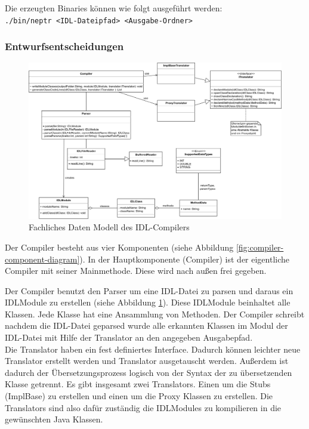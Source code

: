 \documentclass{article}
\begin{document}
Die erzeugten Binaries können wie folgt ausgeführt werden:\\

\texttt{./bin/neptr <IDL-Dateipfad> <Ausgabe-Ordner>}

\subsubsection{Entwurfsentscheidungen}
\begin{figure}[H]
    \centering
    \includegraphics[width=\textwidth]{Compiler_FDM.png}
    \caption[fdm-compiler]{Fachliches Daten Modell des IDL-Compilers}
    \label{fig:fdm-compiler}
\end{figure}

Der Compiler besteht aus vier Komponenten (siehe Abbildung \ref{fig:compiler-component-diagram}). In der
Hauptkomponente (Compiler) ist der eigentliche Compiler mit seiner Mainmethode. Diese wird nach außen frei gegeben.

Der Compiler benutzt den Parser um eine IDL-Datei zu parsen und daraus ein IDLModule zu erstellen (siehe Abbildung
\ref{fig:fdm-compiler}). Diese IDLModule beinhaltet alle Klassen. Jede Klasse hat eine Ansammlung von Methoden.
Der Compiler schreibt nachdem die IDL-Datei geparsed wurde alle erkannten Klassen im Modul der IDL-Datei mit Hilfe der
Translator an den angegeben Ausgabepfad.\\

Die Translator haben ein fest definiertes Interface. Dadurch können leichter neue Translator erstellt werden und
Translator ausgetauscht werden. Außerdem ist dadurch der Übersetzungsprozess logisch von der Syntax der zu übersetzenden
Klasse getrennt.
Es gibt insgesamt zwei Translators. Einen um die Stubs (ImplBase) zu erstellen und einen
um die Proxy Klassen zu erstellen. Die Translators sind also dafür zuständig die IDLModules zu kompilieren in die
gewünschten Java Klassen.\\
\end{document}
